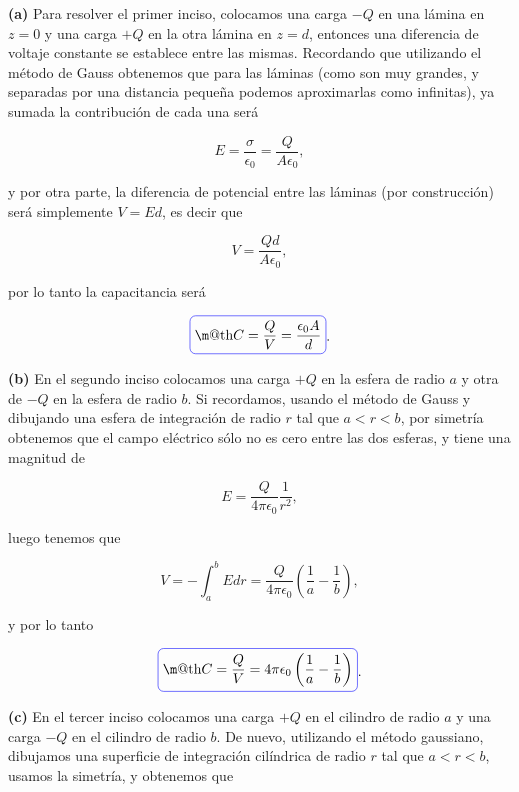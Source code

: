 \documentclass[a4paper,10pt]{article}
\makeatletter
\numberwithin{equation}{section}
\newcommand*{\boxcolor}{blue}
\renewcommand{\boxed}[1]{\textcolor{\boxcolor}{%
\tikz[baseline={([yshift=-1ex]current bounding box.center)}] \node [rectangle, minimum width=1ex,rounded corners,draw] {\normalcolor\m@th$\displaystyle#1$};}}
\makeatother
\begin{document}
\textbf{(a)} Para resolver el primer inciso, colocamos una carga $-Q$ en una lámina 
en $z=0$ y una carga $+Q$ en la otra lámina en $z=d$, entonces una diferencia de 
voltaje constante se establece entre las mismas. Recordando que utilizando el método 
de Gauss obtenemos que para las láminas (como son muy grandes, y separadas por una 
distancia pequeña podemos aproximarlas como infinitas), ya sumada la contribución de 
cada una será 

\begin{equation}
 E = \frac{\sigma}{\epsilon_0} = \frac{Q}{A\epsilon_0},
\end{equation}

y por otra parte, la diferencia de potencial entre las láminas (por construcción) 
será simplemente $V = Ed$, es decir que 

\begin{equation}
 V = \frac{Qd}{A\epsilon_0},
\end{equation}

por lo tanto la capacitancia será 

\begin{equation}
 \boxed{C = \frac{Q}{V} = \frac{\epsilon_0 A}{d}}.
\end{equation}

\textbf{(b)} En el segundo inciso colocamos una carga $+Q$ en la esfera de 
radio $a$ y otra de $-Q$ en la esfera de radio $b$. Si recordamos, usando el método 
de Gauss y dibujando una esfera de integración de radio $r$ tal que $a < r < b$, 
por simetría obtenemos que el campo eléctrico sólo no es cero entre las dos 
esferas, y tiene una magnitud de 

\begin{equation}
 E = \frac{Q}{4\pi\epsilon_0}\frac{1}{r^2},
\end{equation}

luego tenemos que 

\begin{equation}
 V = - \int_a^b E dr = \frac{Q}{4\pi\epsilon_0}\left(\frac{1}{a} - \frac{1}{b}\right),
\end{equation}

y por lo tanto 

\begin{equation}
 \boxed{C = \frac{Q}{V} = 4\pi\epsilon_0\left(\frac{1}{a} - \frac{1}{b}\right)}.
\end{equation}

\textbf{(c)} En el tercer inciso colocamos una carga $+Q$ en el cilindro de radio 
$a$ y una carga $-Q$ en el cilindro de radio $b$. De nuevo, utilizando el método 
gaussiano, dibujamos una superficie de integración cilíndrica de radio $r$ tal que 
$a < r < b$, usamos la simetría, y obtenemos que 
\end{document}
